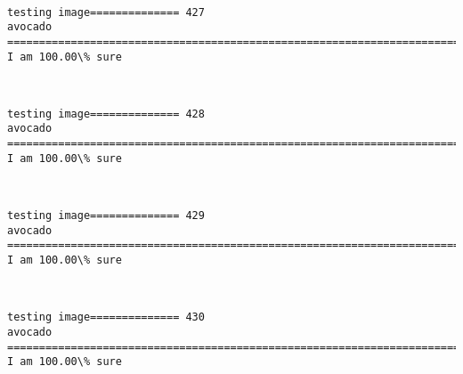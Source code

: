 \documentclass[11pt]{article}
\begin{document}
    \begin{center}
    \end{center}
    { \hspace*{\fill} \\}
    
    \begin{Verbatim}[commandchars=\\\{\}]
testing image============== 427
avocado
============================================================================
I am 100.00\% sure

    \end{Verbatim}

    \begin{center}
    \end{center}
    { \hspace*{\fill} \\}
    
    \begin{Verbatim}[commandchars=\\\{\}]
testing image============== 428
avocado
============================================================================
I am 100.00\% sure

    \end{Verbatim}

    \begin{center}
    \end{center}
    { \hspace*{\fill} \\}
    
    \begin{Verbatim}[commandchars=\\\{\}]
testing image============== 429
avocado
============================================================================
I am 100.00\% sure

    \end{Verbatim}

    \begin{center}
    \end{center}
    { \hspace*{\fill} \\}
    
    \begin{Verbatim}[commandchars=\\\{\}]
testing image============== 430
avocado
============================================================================
I am 100.00\% sure

    \end{Verbatim}
\end{document}
